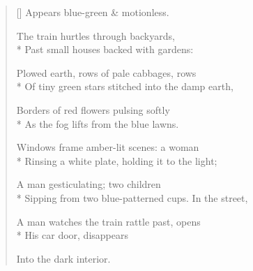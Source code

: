 \label{ch:england}
\settowidth{\versewidth}{Sipping from two blue-patterned cups.     In the street,}
\begin{verse}[\versewidth]
\hspace*{2\vgap} Appears blue-green \& motionless.

The train hurtles through backyards,\\*
Past small houses backed with gardens:

Plowed earth, rows of pale cabbages, rows\\*
Of tiny green stars stitched into the damp earth,

Borders of red flowers pulsing softly\\*
As the fog lifts from the blue lawns.

Windows frame amber-lit scenes: a woman\\*
Rinsing a white plate, holding it to the light;

A man gesticulating; two children\\*
Sipping from two blue-patterned cups. In the street,

A man watches the train rattle past, opens\\*
His car door, disappears

Into the dark interior.
\end{verse}
